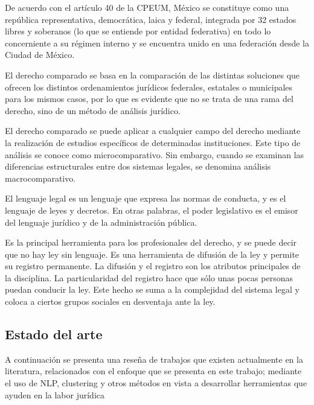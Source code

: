 \documentclass[12pt]{article}
\begin{document}
		De acuerdo con el artículo 40 de la CPEUM, México se constituye como una república representativa, democrática, laica y federal, integrada por 32 estados libres y soberanos (lo que se entiende por entidad federativa) en todo lo concerniente a su régimen interno y se encuentra unido en una federación desde la Ciudad de México.\cite{CPEUM2020}
				
		El derecho comparado se basa en la comparación de las distintas soluciones que ofrecen los distintos ordenamientos jurídicos federales, estatales o municipales para los mismos casos, por lo que es evidente que no se trata de una rama del derecho, sino de un método de análisis jurídico.\cite{Somma2006}
		
		El derecho comparado se puede aplicar a cualquier campo del derecho mediante la realización de estudios específicos de determinadas instituciones. Este tipo de análisis se conoce como microcomparativo. Sin embargo, cuando se examinan las diferencias estructurales entre dos sistemas legales, se denomina análisis macrocomparativo.\cite{Velazco2016}
		
		El lenguaje legal es un lenguaje que expresa las normas de conducta, y es el lenguaje de leyes y decretos. En otras palabras, el poder legislativo es el emisor del lenguaje jurídico y de la administración pública.\cite{Toral2003}
				
		Es la principal herramienta para los profesionales del derecho, y se puede decir que no hay ley sin lenguaje. Es una herramienta de difusión de la ley y permite su registro permanente. La difusión y el registro son los atributos principales de la disciplina. La particularidad del registro hace que sólo unas pocas personas puedan conducir la ley. Este hecho se suma a la complejidad del sistema legal y coloca a ciertos grupos sociales en desventaja ante la ley. \cite{Albi2000}     
		
		
		\subsection{Estado del arte}
		A continuación se presenta una reseña de trabajos que existen actualmente en la literatura, relacionados con el enfoque que se presenta en este trabajo; mediante el uso de NLP, clustering y otros métodos en vista a desarrollar herramientas que ayuden en la labor jurídica
		
\end{document}
